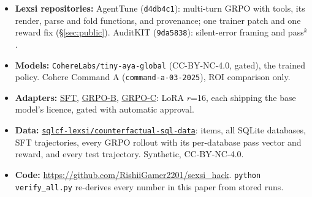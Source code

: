 \documentclass{article}
\newcommand{\code}[1]{\texttt{#1}}
\begin{document}
\begin{itemize}
  \item \textbf{Lexsi repositories:} AgentTune (\code{d4db4c1}): multi-turn GRPO with tools, its render, parse and fold functions, and provenance; one trainer patch and one reward fix (\S\ref{sec:public}). AuditKIT (\code{9da5838}): silent-error framing and pass$^k$.
  \item \textbf{Models:} \code{CohereLabs/tiny-aya-global} (CC-BY-NC-4.0, gated), the trained policy. Cohere Command A (\code{command-a-03-2025}), ROI comparison only.
  \item \textbf{Adapters:} \href{https://huggingface.co/sqlcf-lexsi/tiny-aya-global-sqlcf-sft}{SFT}, \href{https://huggingface.co/sqlcf-lexsi/tiny-aya-global-sqlcf-grpo-b}{GRPO-B}, \href{https://huggingface.co/sqlcf-lexsi/tiny-aya-global-sqlcf-grpo-c}{GRPO-C}: LoRA $r$=16, each shipping the base model's licence, gated with automatic approval.
  \item \textbf{Data:} \href{https://huggingface.co/datasets/sqlcf-lexsi/counterfactual-sql-data}{\code{sqlcf-lexsi/counterfactual-sql-data}}: items, all SQLite databases, SFT trajectories, every GRPO rollout with its per-database pass vector and reward, and every test trajectory. Synthetic, CC-BY-NC-4.0.
  \item \textbf{Code:} \url{https://github.com/RishiiGamer2201/sexsi_hack}. \code{python verify\_all.py} re-derives every number in this paper from stored runs.
\end{itemize}
\end{document}
